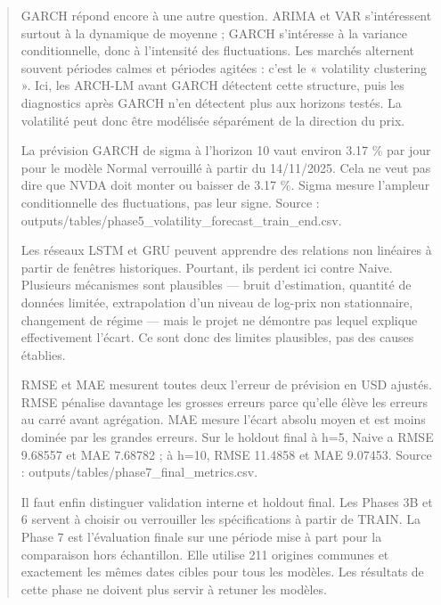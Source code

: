 \begin{quote}
GARCH répond encore à une autre question. ARIMA et VAR s’intéressent surtout à la dynamique de moyenne ; GARCH s’intéresse à la variance conditionnelle, donc à l’intensité des fluctuations. Les marchés alternent souvent périodes calmes et périodes agitées : c’est le « volatility clustering ». Ici, les ARCH-LM avant GARCH détectent cette structure, puis les diagnostics après GARCH n’en détectent plus aux horizons testés. La volatilité peut donc être modélisée séparément de la direction du prix.

La prévision GARCH de sigma à l’horizon 10 vaut environ 3.17 \% par jour pour le modèle Normal verrouillé à partir du 14/11/2025. Cela ne veut pas dire que NVDA doit monter ou baisser de 3.17 \%. Sigma mesure l’ampleur conditionnelle des fluctuations, pas leur signe. Source : outputs/tables/phase5\_volatility\_forecast\_train\_end.csv.

Les réseaux LSTM et GRU peuvent apprendre des relations non linéaires à partir de fenêtres historiques. Pourtant, ils perdent ici contre Naive. Plusieurs mécanismes sont plausibles --- bruit d’estimation, quantité de données limitée, extrapolation d’un niveau de log-prix non stationnaire, changement de régime --- mais le projet ne démontre pas lequel explique effectivement l’écart. Ce sont donc des limites plausibles, pas des causes établies.

RMSE et MAE mesurent toutes deux l’erreur de prévision en USD ajustés. RMSE pénalise davantage les grosses erreurs parce qu’elle élève les erreurs au carré avant agrégation. MAE mesure l’écart absolu moyen et est moins dominée par les grandes erreurs. Sur le holdout final à h=5, Naive a RMSE 9.68557 et MAE 7.68782 ; à h=10, RMSE 11.4858 et MAE 9.07453. Source : outputs/tables/phase7\_final\_metrics.csv.

Il faut enfin distinguer validation interne et holdout final. Les Phases 3B et 6 servent à choisir ou verrouiller les spécifications à partir de TRAIN. La Phase 7 est l’évaluation finale sur une période mise à part pour la comparaison hors échantillon. Elle utilise 211 origines communes et exactement les mêmes dates cibles pour tous les modèles. Les résultats de cette phase ne doivent plus servir à retuner les modèles.
\end{quote}
